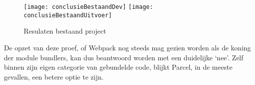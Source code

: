 \begin{figure}[h]
    \texttt{[image: conclusieBestaandDev]}
        \centering
        \texttt{[image: conclusieBestaandUitvoer]}
        \centering
        \caption{Resulaten bestaand project}
    \end{figure}

    De opzet van deze proef, of Webpack nog steeds mag gezien worden als de koning der module bundlers, kan dus beantwoord worden met een duidelijke ‘nee’. Zelf binnen zijn eigen categorie van gebundelde code, blijkt Parcel, in de meeste gevallen, een betere optie te zijn. 